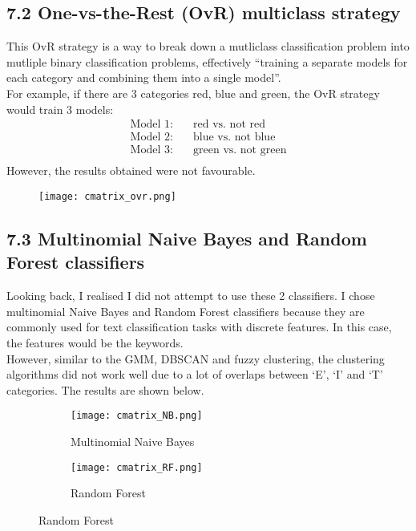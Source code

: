 \subsection*{7.2 One-vs-the-Rest (OvR) multiclass strategy}
This OvR strategy is a way to break down a mutliclass classification problem into mutliple binary classification problems, effectively ``training a separate models for each category and combining them into a single model''. \\
For example, if there are 3 categories red, blue and green, the OvR strategy would train 3 models: \\
\begin{align*}
    \text{Model 1:} \quad & \text{red vs. not red} \\
    \text{Model 2:} \quad & \text{blue vs. not blue} \\
    \text{Model 3:} \quad & \text{green vs. not green} \\
\end{align*}
However, the results obtained were not favourable.
\begin{figure}[htbp]
    \centering
    \texttt{[image: cmatrix\_ovr.png]}
\end{figure}


\subsection*{7.3 Multinomial Naive Bayes and Random Forest classifiers}
Looking back, I realised I did not attempt to use these 2 classifiers. I chose multinomial Naive Bayes and Random Forest classifiers because they are commonly used for text classification tasks with discrete features. In this case, the features would be the keywords. \\
However, similar to the GMM, DBSCAN and fuzzy clustering, the clustering algorithms did not work well due to a lot of overlaps between `E', `I' and `T' categories. The results are shown below.\\

\begin{figure}[htbp]
    \centering
    \begin{subfigure}[b]{0.45\textwidth}
        \texttt{[image: cmatrix\_NB.png]}
        \caption{Multinomial Naive Bayes}
    \end{subfigure}
    \hfill
    \begin{subfigure}[b]{0.45\textwidth}
        \texttt{[image: cmatrix\_RF.png]}
        \caption{Random Forest}
    \end{subfigure}
\end{figure}
\clearpage

